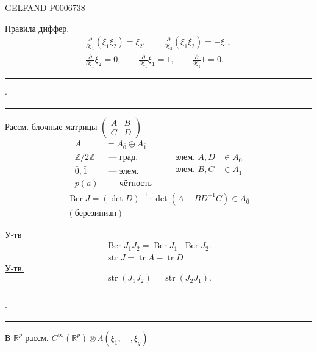 \begin{GelfandAdjacentEvidence}{GELFAND-P000673}{8}


Правила диффер.
\[
\begin{gathered}
\frac{\partial}{\partial\xi_1}(\xi_1\xi_2)=\xi_2,\qquad
\frac{\partial}{\partial\xi_2}(\xi_1\xi_2)=-\xi_1,\\
\frac{\partial}{\partial\xi_1}\xi_2=0,\qquad
\frac{\partial}{\partial\xi_1}\xi_1=1,\qquad
\frac{\partial}{\partial\xi_1}1=0.
\end{gathered}
\]

\noindent\rule{12mm}{.45pt}\enspace\(\cdot\)\enspace\rule{14mm}{.45pt}

Рассм. блочные матрицы \(\begin{pmatrix}A&B\\ C&D\end{pmatrix}\)
\[
\begin{aligned}
A&=A_{\bar{0}}\oplus A_{\bar{1}}\\
\mathbb Z/2\mathbb Z&\text{ --- град.}\\
\bar{0},\bar{1}&\text{ --- элем.}\\
p(a)&\text{ --- чётность}
\end{aligned}
\qquad
\begin{aligned}
\text{элем. }A,D&\in A_{\bar{0}}\\
\text{элем. }B,C&\in A_{\bar{1}}
\end{aligned}
\]
\[
\begin{gathered}
\operatorname{Ber}J=(\det D)^{-1}\cdot\det(A-BD^{-1}C)\in A_{\bar{0}}\\
(\text{березиниан})
\end{gathered}
\]

\underline{У-тв}
\[
\begin{gathered}
\operatorname{Ber}J_1J_2=\operatorname{Ber}J_1\cdot\operatorname{Ber}J_2.\\
\operatorname{str}J=\operatorname{tr}A-\operatorname{tr}D
\end{gathered}
\]
\underline{У-тв.}
\[
\operatorname{str}(J_1J_2)=\operatorname{str}(J_2J_1).
\]

\noindent\rule{11mm}{.45pt}\enspace\(\cdot\)\enspace\rule{15mm}{.45pt}

В \(\mathbb R^p\) рассм. \(C^\infty(\mathbb R^p)\otimes\Lambda(\xi_1,\mathord{\text{---}},\xi_q)\)
\end{GelfandAdjacentEvidence}


